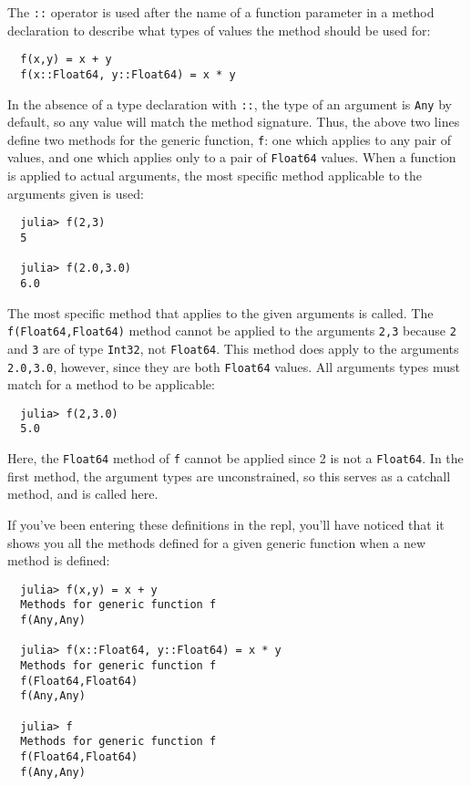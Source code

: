 \documentclass{article}
\begin{document}
The \verb|::| operator is used after the name of a function parameter in a method declaration to describe what types of values the method should be used for:
\begin{verbatim}
  f(x,y) = x + y
  f(x::Float64, y::Float64) = x * y
\end{verbatim}
In the absence of a type declaration with \verb|::|, the type of an argument is \verb|Any| by default, so any value will match the method signature.
Thus, the above two lines define two methods for the generic function, \verb|f|:
one which applies to any pair of values, and one which applies only to a pair of \verb|Float64| values.
When a function is applied to actual arguments, the most specific method applicable to the arguments given is used:
\begin{verbatim}
  julia> f(2,3)
  5

  julia> f(2.0,3.0)
  6.0
\end{verbatim}
The most specific method that applies to the given arguments is called.
The \verb|f(Float64,Float64)| method cannot be applied to the arguments \verb|2,3| because \verb|2| and \verb|3| are of type \verb|Int32|, not \verb|Float64|.
This method does apply to the arguments \verb|2.0,3.0|, however, since they are both \verb|Float64| values.
All arguments types must match for a method to be applicable:
\begin{verbatim}
  julia> f(2,3.0)
  5.0
\end{verbatim}
Here, the \verb|Float64| method of \verb|f| cannot be applied since 2 is not a \verb|Float64|.
In the first method, the argument types are unconstrained, so this serves as a catchall method, and is called here.

If you've been entering these definitions in the repl, you'll have noticed that it shows you all the methods defined for a given generic function when a new method is defined:
\begin{verbatim}
  julia> f(x,y) = x + y
  Methods for generic function f
  f(Any,Any)

  julia> f(x::Float64, y::Float64) = x * y
  Methods for generic function f
  f(Float64,Float64)
  f(Any,Any)

  julia> f
  Methods for generic function f
  f(Float64,Float64)
  f(Any,Any)
\end{verbatim}
\end{document}
